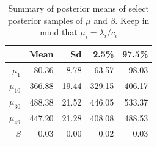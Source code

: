 \documentclass{asaproc}
\begin{document}
\begin{table}[h!]
\centering
\label{summary_m1}
\caption{Summary of posterior means of select posterior samples of $\mu$ and $\beta$. Keep in mind that $\mu_i = \lambda_i/c_i$}
\begin{tabular}{rrrrr}
  \hline
 & Mean & Sd & 2.5\% & 97.5\% \\ 
  \hline
$\mu_1$ & 80.36 & 8.78 & 63.57 & 98.03 \\ 
  $\mu_{10}$ & 366.88 & 19.44 & 329.15 & 406.17 \\ 
  $\mu_{30}$ & 488.38 & 21.52 & 446.05 & 533.37 \\ 
  $\mu_{49}$ & 447.20 & 21.28 & 408.08 & 488.53 \\ 
  $\beta$ & 0.03 & 0.00 & 0.02 & 0.03 \\ 
   \hline
\end{tabular}
\end{table}
\end{document}
